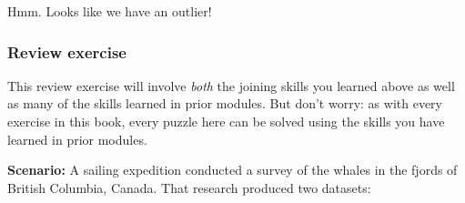 \documentclass[]{book}
\begin{document}
Hmm. Looks like we have an outlier!

\hypertarget{review-exercise-1}{%
\subsubsection*{Review exercise}\label{review-exercise-1}}

This review exercise will involve \emph{both} the joining skills you learned above as well as many of the skills learned in prior modules. But don't worry: as with every exercise in this book, every puzzle here can be solved using the skills you have learned in prior modules.

\textbf{Scenario:} A sailing expedition conducted a survey of the whales in the fjords of British Columbia, Canada. That research produced two datasets:
\end{document}
